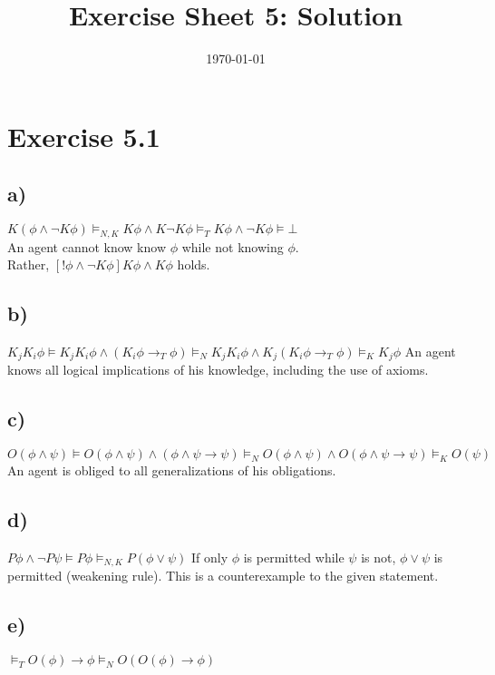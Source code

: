 \documentclass[a4paper]{article}
\begin{document}
\title{Exercise Sheet 5: Solution}
\author{}
\date{\today}

\section{Exercise 5.1}
\subsection{a)}
$
K(\phi \land \lnot K \phi)
\models_{N, K} K \phi \land K \lnot K \phi
\models_T K \phi \land \lnot K \phi
\models \bot
$\\
An agent cannot know know $\phi$ while not knowing $\phi$.\\
Rather, $[!\phi \land \lnot K\phi]K\phi \land K\phi$ holds.

\subsection{b)}
$
K_j K_i \phi
\models K_j K_i \phi \land (K_i \phi \rightarrow_T \phi)
\models_N K_j K_i \phi \land K_j(K_i \phi \rightarrow_T \phi)
\models_K K_j \phi
$
An agent knows all logical implications of his knowledge, including the use of axioms. 

\subsection{c)}
$
O(\phi \land \psi)
\models O(\phi \land \psi) \land (\phi \land \psi \rightarrow \psi)
\models_N O(\phi \land \psi) \land O(\phi \land \psi \rightarrow \psi)
\models_K O(\psi)
$
An agent is obliged to all generalizations of his obligations.

\subsection{d)}
$
P\phi \land \lnot P\psi
\models P\phi
\models_{N, K} P(\phi \lor \psi)
$
If only $\phi$ is permitted while $\psi$ is not, $\phi \lor \psi$ is permitted (weakening rule). This is a counterexample to the given statement.
\subsection{e)}
$
\models_T O(\phi) \rightarrow \phi
\models_N O(O(\phi) \rightarrow \phi)
$
\end{document}
